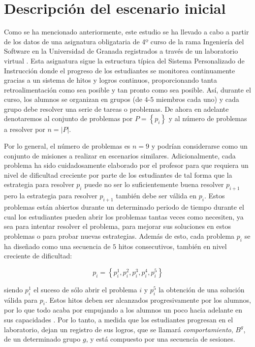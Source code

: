 \section{Descripción del escenario inicial}\label{sec:initial}

Como se ha mencionado anteriormente, este estudio se ha llevado a cabo a partir de los datos de una asignatura obligataria de 4º curso de la rama Ingeniería del Software en la Universidad de Granada registrados a través de un laboratorio virtual \cite{Vidal_2016}. Esta asignatura sigue la estructura típica del Sistema Personalizado de Instrucción \cite{Keller_1968} donde el progreso de los estudiantes se monitorea continuamente gracias a un sistema de hitos y logros continuos, proporcionando tanta retroalimentación como sea posible y tan pronto como sea posible. Así, durante el curso, los alumnos se organizan en grupos (de $4$-$5$ miembros cada uno) y cada grupo debe resolver una serie de tareas o problemas. De ahora en adelante denotaremos al conjunto de problemas por $P = \left\lbrace p_i \right\rbrace$ y al número de problemas a resolver por $n = |P|$.

Por lo general, el número de problemas es $n = 9$ y podrían considerarse como un conjunto de misiones a realizar en escenarios similares. Adicionalmente, cada problema ha sido cuidadosamente elaborado por el profesor para que requiera un nivel de dificultad creciente por parte de los estudiantes de tal forma que la estrategia para resolver $p_i$ puede no ser lo suficientemente buena resolver $p_{i+1}$ pero la estrategia para resolver $p_{i+1}$ también debe ser válida en $p_i$. Estos problemas están abiertos durante un determinado periodo de tiempo durante el cual los estudiantes pueden abrir los problemas tantas veces como necesiten, ya sea para intentar resolver el problema, para mejorar sus soluciones en estos problemas o para probar nuevas estrategias. Además de esto, cada problema $p_i$ se ha diseñado como una secuencia de $5$ hitos consecutivos, también en nivel creciente de dificultad:

\begin{equation}
p_i = \left\lbrace p_i^1 , p_i^2 , p_i^3 , p_i^4 , p_i^5 \right\rbrace
\end{equation}

siendo $p_i^1$ el suceso de sólo abrir el problema $i$ y $p_i^5$ la obtención de una solución válida para $p_i$. Estos hitos deben ser alcanzados progresivamente por los alumnos, por lo que todo acaba por empujando a los alumnos un poco hacia adelante en sus capacidades \cite{Keller_1968}. Por lo tanto, a medida que los estudiantes progresan en el laboratorio, dejan un registro de sus logros, que se llamará \emph{comportamiento}, $B^g$, de un determinado grupo $g$, y está compuesto por una secuencia de sesiones.

